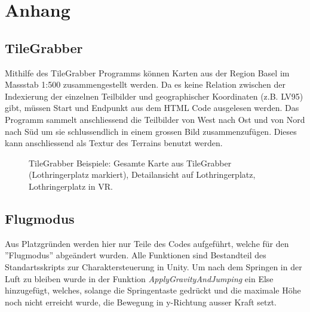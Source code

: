 \chapter{Anhang}\label{c.anhang}
\vspace{-20pt}
\section{TileGrabber}\label{s.tilegrabber}
Mithilfe des TileGrabber Programms können Karten aus der Region Basel im Massstab 1:500 zusammengestellt werden. Da es keine Relation zwischen der Indexierung der einzelnen Teilbilder und geographischer Koordinaten (z.B. LV95) gibt, müssen Start und Endpunkt aus dem HTML Code ausgelesen werden. Das Programm sammelt anschliessend die Teilbilder von West nach Ost und von Nord nach Süd um sie schlussendlich in einem grossen Bild zusammenzufügen. Dieses kann anschliessend als Textur des Terrains benutzt werden.

\renewcommand{\baselinestretch}{1}\normalsize

\renewcommand{\baselinestretch}{1.5}\normalsize
\begin{figure}[htp]%
	\centering
	\hspace{8pt}%
	
	\hspace{48pt}%
	\hspace{8pt}%

	\caption[TileGrabber Beispiele.]
	{TileGrabber Beispiele:
		 Gesamte Karte aus TileGrabber (Lothringerplatz markiert),
		 Detailansicht auf Lothringerplatz,
		 Lothringerplatz in VR.}%
\end{figure}


\newpage
\section{Flugmodus}\label{s.flug}
Aus Platzgründen werden hier nur Teile des Codes aufgeführt, welche für den ''Flugmodus'' abgeändert wurden. Alle Funktionen sind Bestandteil des Standartsskripts zur Charaktersteuerung in Unity. 
Um nach dem Springen in der Luft zu bleiben wurde in der Funktion \textit{ApplyGravityAndJumping} ein Else hinzugefügt, welches, solange die Springentaste gedrückt und die maximale Höhe noch nicht erreicht wurde, die Bewegung in y-Richtung ausser Kraft setzt. 

